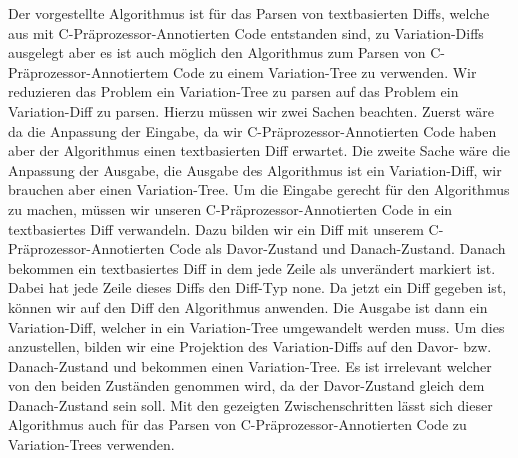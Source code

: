 Der vorgestellte Algorithmus ist für das Parsen von textbasierten Diffs, welche aus mit C-Präprozessor-Annotierten Code entstanden sind, zu Variation-Diffs ausgelegt aber es ist auch möglich den Algorithmus zum Parsen von C-Präprozessor-Annotiertem Code zu einem Variation-Tree zu verwenden. Wir reduzieren das Problem ein Variation-Tree zu parsen auf das Problem ein Variation-Diff zu parsen. Hierzu müssen wir zwei Sachen beachten. Zuerst wäre da die Anpassung der Eingabe, da wir C-Präprozessor-Annotierten Code haben aber der Algorithmus einen textbasierten Diff erwartet. Die zweite Sache wäre die Anpassung der Ausgabe, die Ausgabe des Algorithmus ist ein Variation-Diff, wir brauchen aber einen Variation-Tree. Um die Eingabe gerecht für den Algorithmus zu machen, müssen wir unseren C-Präprozessor-Annotierten Code in ein textbasiertes Diff verwandeln. Dazu bilden wir ein Diff mit unserem C-Präprozessor-Annotierten Code als Davor-Zustand und Danach-Zustand. Danach bekommen ein textbasiertes Diff in dem jede Zeile als unverändert markiert ist. Dabei hat jede Zeile dieses Diffs den Diff-Typ none. Da jetzt ein Diff gegeben ist, können wir auf den Diff den Algorithmus anwenden. Die Ausgabe ist dann ein Variation-Diff, welcher in ein Variation-Tree umgewandelt werden muss. Um dies anzustellen, bilden wir eine Projektion des Variation-Diffs auf den Davor- bzw. Danach-Zustand und bekommen einen Variation-Tree. Es ist irrelevant welcher von den beiden Zuständen genommen wird, da der Davor-Zustand gleich dem Danach-Zustand sein soll. Mit den gezeigten Zwischenschritten lässt sich dieser Algorithmus auch für das Parsen von C-Präprozessor-Annotierten Code zu Variation-Trees verwenden.\\


